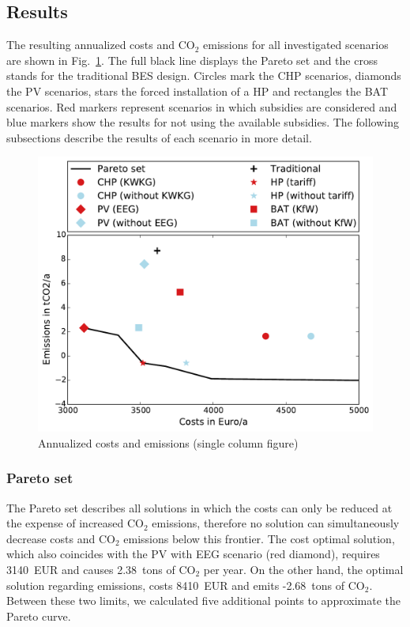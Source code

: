 \subsection{Results}
\label{ssec: Results}

The resulting annualized costs and CO$_2$ emissions for all investigated scenarios are shown in Fig.~\ref{fig: pareto set}.
The full black line displays the Pareto set and the cross stands for the traditional BES design.
Circles mark the CHP scenarios, diamonds the PV scenarios, stars the forced installation of a HP and rectangles the BAT scenarios.
Red markers represent scenarios in which subsidies are considered and blue markers show the results for not using the available subsidies.
The following subsections describe the results of each scenario in more detail.

\begin{figure}[h!]
	\begin{center}
		\includegraphics[width=\linewidth]{figures/pareto_set.pdf}
		\caption{Annualized costs and emissions (single column figure)}
		\label{fig: pareto set}
	\end{center}
\end{figure}

\subsubsection{Pareto set}
The Pareto set describes all solutions in which the costs can only be reduced at the expense of increased CO$_2$ emissions, therefore no solution can simultaneously decrease costs and CO$_2$ emissions below this frontier.
The cost optimal solution, which also coincides with the PV with EEG scenario (red diamond), requires 3140~EUR and causes 2.38~tons of CO$_2$ per year.
On the other hand, the optimal solution regarding emissions, costs 8410~EUR and emits -2.68~tons of CO$_2$.
Between these two limits, we calculated five additional points to approximate the Pareto curve.

